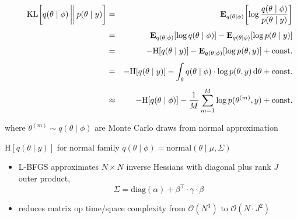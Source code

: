 \documentclass[9pt]{report}
\begin{document}
\vspace*{-4pt}
  \begin{eqnarray*}
\null \qquad \textrm{KL}\!\left[q(\theta \mid \phi) \,\bigg|\bigg|\, p(\theta \mid y)\right]
  & = &
  \mathbb{E}_{q(\theta \mid \phi)}
        \!\left[ \log \frac{q(\theta \mid \phi)}{p(\theta \mid y)} \right]
  \\[4pt]
  & = &   \mathbb{E}_{q(\theta \mid \phi)}[\log q(\theta \mid \phi)]
        - \mathbb{E}_{q(\theta \mid \phi)}[\log p(\theta \mid y)]
  \\[4pt]
  & = &   - \textrm{H}\!\left[q(\theta \mid y)\right] - \mathbb{E}_{q(\theta \mid \phi)}[\log p(\theta, y)] + \textrm{const.}
  \\[4pt]
  & = & - \textrm{H}\!\left[q(\theta \mid y)\right] - \int_{\theta} q(\theta \mid \phi) \cdot \log p(\theta, y) \, \textrm{d}\theta + \textrm{const.}
  \\[4pt]
  & \approx & -\textrm{H}\!\left[q(\theta \mid \phi)\right] - \frac{1}{M} \sum_{m=1}^M \log p(\theta^{(m)}, y) + \textrm{const.}
  \end{eqnarray*}
  \vspace*{-6pt}
\begin{subitemize}
\item where $\theta^{(m)} \sim q(\theta \mid \phi)$ are Monte Carlo draws from normal approximation 
\item {} $\textrm{H}\!\left[q(\theta \mid y)\right]$ for normal family $q(\theta \mid \phi) = \textrm{normal}(\theta \mid \mu, \Sigma)$
\end{subitemize}

\begin{itemize}
\item L-BFGS approximates $N \times N$ inverse Hessians with diagonal plus rank $J$ outer product,
  \[
    \Sigma = \textrm{diag}(\alpha) + \beta^{\top} \cdot \gamma \cdot \beta
  \]
\item reduces matrix op time/space complexity from $\mathcal{O}(N^3)$ to $\mathcal{O}(N \cdot J^2)$
\end{itemize}
\end{document}
